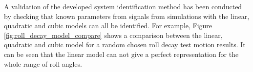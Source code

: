 A validation of the developed system identification method has been conducted by checking that known parameters from signals from simulations with the linear, quadratic and cubic models can all be identified. For example,
Figure \ref{fig:roll_decay_model_compare} shows a comparison between the linear, quadratic and cubic model for a random chosen roll decay test motion results. It can be seen that the linear model can not give a perfect representation for the whole range of roll angles.    


